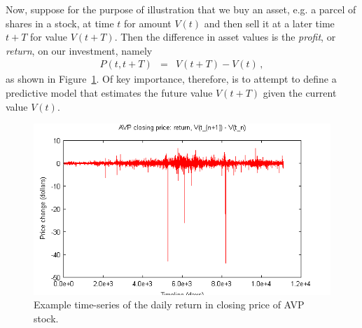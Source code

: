 \documentclass[a4paper]{article}
\begin{document}
Now, suppose for the purpose of illustration that
we buy an asset, e.g. a parcel of shares in a stock, at time $t$ for amount $V(t)$ and then sell it at a later
time $t+T$ for value $V(t+T)$. Then the difference in asset values is the
{\em profit}, or {\em return}, on our investment, namely
\begin{eqnarray}
  P(t,t+T) & = & V(t+T)-V(t)\,,
\end{eqnarray}
as shown in Figure~\ref{fig:avp-price-diff}.
Of key importance, therefore, is to attempt to define a predictive model
that estimates the future value $V(t+T)$ given the current value $V(t)$.
\begin{figure}[hbt]
\includegraphics[scale=0.8]{figures/avp-price-close-diff.png}
\caption{Example time-series of the daily return in closing price
of AVP stock.}
\label{fig:avp-price-diff}
\end{figure}
\end{document}

